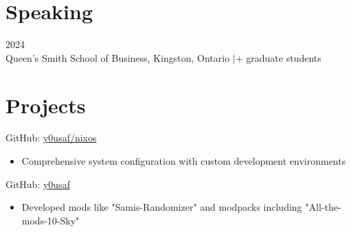 \documentclass[letterpaper,10pt]{article}
\begin{document}
\section{Speaking}

\hspace{0.15in}{\bfseries Guest Lecturer on AI and Synthetic Data Generation for MMA Program} \hfill {\small 2024} \\
\hspace{0.15in}Queen's Smith School of Business, Kingston, Ontario \enspace$|$+ graduate students

\vspace{-4pt}

\section{Projects}

\hspace{0.15in}{\bfseries NixOS Configuration} \hfill {\small GitHub: \href{https://github.com/y0usaf/nixos}{y0usaf/nixos}}
\vspace{-2pt}
\begin{itemize}[leftmargin=0.35in, itemsep=-3pt, topsep=-3pt, labelsep=0.035in]
\item Comprehensive system configuration with custom development environments
\end{itemize}
\vspace{-6pt}

\hspace{0.15in}{\bfseries Minecraft Modding} \hfill {\small GitHub: \href{https://github.com/y0usaf}{y0usaf}}
\vspace{-2pt}
\begin{itemize}[leftmargin=0.35in, itemsep=-3pt, topsep=-3pt, labelsep=0.035in]
\item Developed mods like "Samis-Randomizer" and modpacks including "All-the-mods-10-Sky"
\end{itemize}
\vspace{-6pt}
\end{document}
